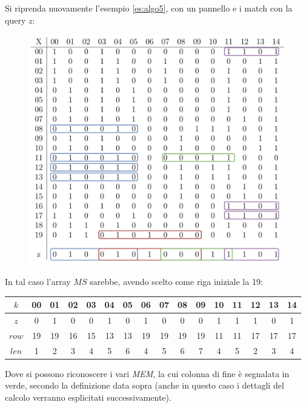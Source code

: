 \begin{esempio}
  \label{es:ms}
  Si riprenda nuovamente l'esempio \ref{es:algo5}, con un pannello e i match con
  la query $z$:
  \begin{figure}[H]
    \centering
    \includegraphics[scale = 0.365]{img/pbwtmatch.pdf}
  \end{figure}
  In tal caso l'array $MS$ sarebbe, avendo scelto come riga iniziale la 19:
  \begin{table}[H]
    \footnotesize{}
    \centering
    \begin{tabular}{c|ccccccccccccccc}
      $k$ & 00 & 01 & 02 & 03 & 04 &  {\color{nordgreen}05} & 06 & 07 & 08
      &  {\color{nordgreen}09} & 10 &  {\color{nordgreen}11} & 12 & 13
      &  {\color{nordgreen}14} \\
      \hline
      \hline
      $z$ & 0 & 1 & 0 & 0 & 1 &  {\color{nordgreen}0} & 1 & 0 & 0
      &  {\color{nordgreen}0} & 1 &  {\color{nordgreen}1} & 1 & 0
      &  {\color{nordgreen}1} \\
      \hline
      $row$ & 19 & 19 & 16 & 15 & 13 &  {\color{nordgreen}13} & 19 & 19 & 19
      &  {\color{nordgreen}19} & 11 &  {\color{nordgreen}11} & 17 & 17
      &  {\color{nordgreen}17} \\
      $len$ & 1 & 2 & 3 & 4 & 5 & {\color{nordgreen}6} & 4 & 5 & 6
      & {\color{nordgreen}7} & 4 & {\color{nordgreen}5} & 2 & 3
      & {\color{nordgreen}4}\\
    \end{tabular}
  \end{table}
  Dove si possono riconoscere i vari \textit{MEM}, la cui colonna di fine è
  segnalata in verde, secondo la definizione data
  sopra (anche in questo caso i dettagli del calcolo
  verranno esplicitati successivamente). 
\end{esempio}
